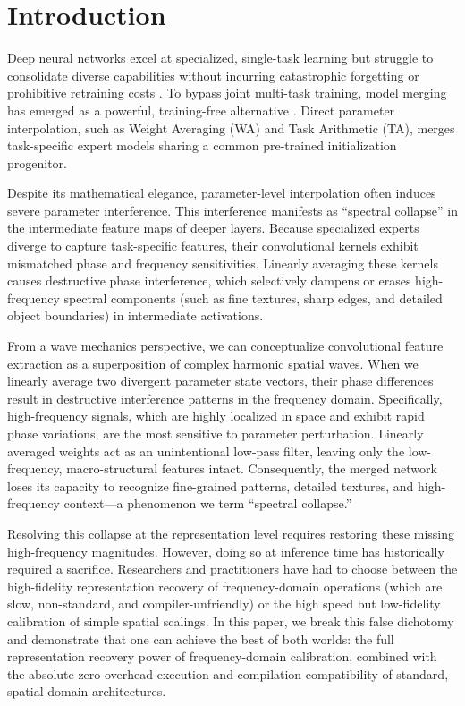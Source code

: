\documentclass{article}
\theoremstyle{plain}
\theoremstyle{definition}
\theoremstyle{remark}
\begin{document}
\section{Introduction}
\label{sec:intro}

Deep neural networks excel at specialized, single-task learning but struggle to consolidate diverse capabilities without incurring catastrophic forgetting or prohibitive retraining costs \cite{Samuel59}. To bypass joint multi-task training, model merging has emerged as a powerful, training-free alternative \cite{DudaHart2nd}. Direct parameter interpolation, such as Weight Averaging (WA) and Task Arithmetic (TA), merges task-specific expert models sharing a common pre-trained initialization progenitor.

Despite its mathematical elegance, parameter-level interpolation often induces severe parameter interference. This interference manifests as ``spectral collapse'' in the intermediate feature maps of deeper layers. Because specialized experts diverge to capture task-specific features, their convolutional kernels exhibit mismatched phase and frequency sensitivities. Linearly averaging these kernels causes destructive phase interference, which selectively dampens or erases high-frequency spectral components (such as fine textures, sharp edges, and detailed object boundaries) in intermediate activations.

From a wave mechanics perspective, we can conceptualize convolutional feature extraction as a superposition of complex harmonic spatial waves. When we linearly average two divergent parameter state vectors, their phase differences result in destructive interference patterns in the frequency domain. Specifically, high-frequency signals, which are highly localized in space and exhibit rapid phase variations, are the most sensitive to parameter perturbation. Linearly averaged weights act as an unintentional low-pass filter, leaving only the low-frequency, macro-structural features intact. Consequently, the merged network loses its capacity to recognize fine-grained patterns, detailed textures, and high-frequency context—a phenomenon we term ``spectral collapse.''

Resolving this collapse at the representation level requires restoring these missing high-frequency magnitudes. However, doing so at inference time has historically required a sacrifice. Researchers and practitioners have had to choose between the high-fidelity representation recovery of frequency-domain operations (which are slow, non-standard, and compiler-unfriendly) or the high speed but low-fidelity calibration of simple spatial scalings. In this paper, we break this false dichotomy and demonstrate that one can achieve the best of both worlds: the full representation recovery power of frequency-domain calibration, combined with the absolute zero-overhead execution and compilation compatibility of standard, spatial-domain architectures.
\end{document}
